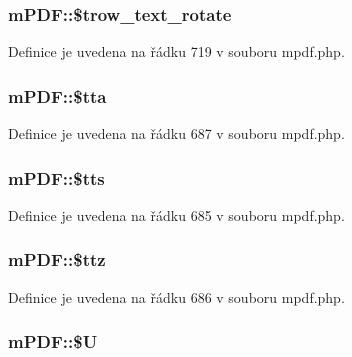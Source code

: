 \hypertarget{classm_p_d_f_a6e98c22b61b2584f3a10121b0282673b}{
\subsubsection[{\$trow\-\_\-text\-\_\-rotate}]{\setlength{\rightskip}{0pt plus 5cm}m\-P\-D\-F\-::\$trow\-\_\-text\-\_\-rotate}}\label{classm_p_d_f_a6e98c22b61b2584f3a10121b0282673b}


Definice je uvedena na řádku 719 v souboru mpdf.\-php.

\hypertarget{classm_p_d_f_a7da280df95e9c7e9eef0c55b3322102e}{
\subsubsection[{\$tta}]{\setlength{\rightskip}{0pt plus 5cm}m\-P\-D\-F\-::\$tta}}\label{classm_p_d_f_a7da280df95e9c7e9eef0c55b3322102e}


Definice je uvedena na řádku 687 v souboru mpdf.\-php.

\hypertarget{classm_p_d_f_a66884747ce7e880ea8e6798514529e64}{
\subsubsection[{\$tts}]{\setlength{\rightskip}{0pt plus 5cm}m\-P\-D\-F\-::\$tts}}\label{classm_p_d_f_a66884747ce7e880ea8e6798514529e64}


Definice je uvedena na řádku 685 v souboru mpdf.\-php.

\hypertarget{classm_p_d_f_af54c65ead3e6f3b9f6b57868e289470e}{
\subsubsection[{\$ttz}]{\setlength{\rightskip}{0pt plus 5cm}m\-P\-D\-F\-::\$ttz}}\label{classm_p_d_f_af54c65ead3e6f3b9f6b57868e289470e}


Definice je uvedena na řádku 686 v souboru mpdf.\-php.

\hypertarget{classm_p_d_f_a3acaee7bea767ba3a93bf03f1bd597e4}{
\subsubsection[{\$\-U}]{\setlength{\rightskip}{0pt plus 5cm}m\-P\-D\-F\-::\$\-U}}\label{classm_p_d_f_a3acaee7bea767ba3a93bf03f1bd597e4}


